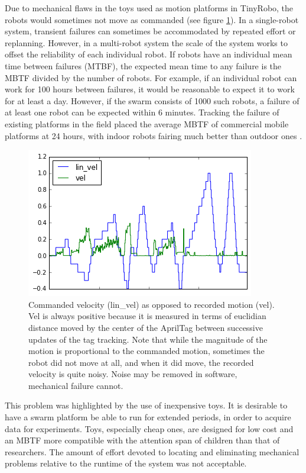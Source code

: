 Due to mechanical flaws in the toys used as motion platforms in TinyRobo, the robots would sometimes not move as commanded (see figure \ref{motor-speed-fig}). 
In a single-robot system, transient failures can sometimes be accommodated by repeated effort or replanning. 
However, in a multi-robot system the scale of the system works to offset the reliability of each individual robot. 
If robots have an individual mean time between failures (MTBF), the expected mean time to any failure is the MBTF divided by the number of robots. 
For example, if an individual robot can work for 100 hours between failures, it would be reasonable to expect it to work for at least a day. 
However, if the swarm consists of 1000 such robots, a failure of at least one robot can be expected within 6 minutes. 
Tracking the failure of existing platforms in the field placed the average MBTF of commercial mobile platforms at 24 hours, with indoor robots fairing much better than outdoor ones \citep{carlson2004follow}.


\begin{figure}[t]
	\includegraphics{motion_vs_cmd}
	\centering
	\caption{Commanded velocity (lin\_vel) as opposed to recorded motion (vel). Vel is always positive because it is measured in terms of euclidian distance moved by the center of the AprilTag between successive updates of the tag tracking. 
		Note that while the magnitude of the motion is proportional to the commanded motion, sometimes the robot did not move at all, and when it did move, the recorded velocity is quite noisy. Noise may be removed in software, mechanical failure cannot.} 
	\label{motor-speed-fig}
\end{figure}

This problem was highlighted by the use of inexpensive toys. 
It is desirable to have a swarm platform be able to run for extended periods, in order to acquire data for experiments. 
Toys, especially cheap ones, are designed for low cost and an MBTF more compatible with the attention span of children than that of researchers. 
The amount of effort devoted to locating and eliminating mechanical problems relative to the runtime of the system was not acceptable.

